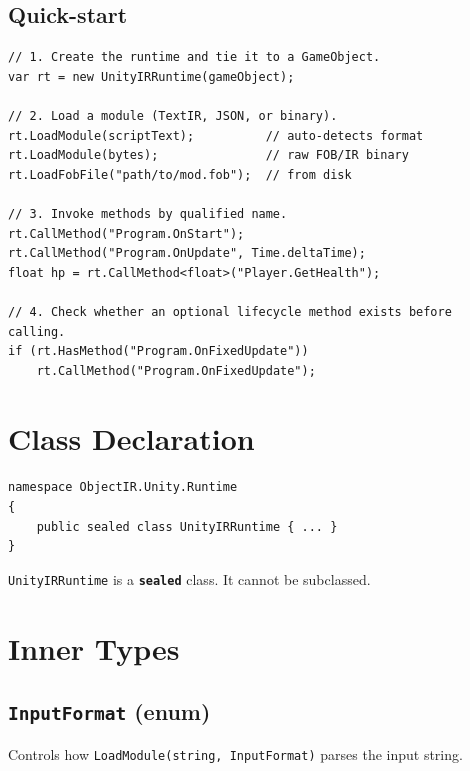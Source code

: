\documentclass[11pt,a4paper]{article}
\newcommand{\code}[1]{\texttt{\small #1}}
\newcommand{\kword}[1]{\textbf{\texttt{\small #1}}}
\begin{document}
\subsection{Quick-start}

\begin{lstlisting}[style=cs]
// 1. Create the runtime and tie it to a GameObject.
var rt = new UnityIRRuntime(gameObject);

// 2. Load a module (TextIR, JSON, or binary).
rt.LoadModule(scriptText);          // auto-detects format
rt.LoadModule(bytes);               // raw FOB/IR binary
rt.LoadFobFile("path/to/mod.fob");  // from disk

// 3. Invoke methods by qualified name.
rt.CallMethod("Program.OnStart");
rt.CallMethod("Program.OnUpdate", Time.deltaTime);
float hp = rt.CallMethod<float>("Player.GetHealth");

// 4. Check whether an optional lifecycle method exists before calling.
if (rt.HasMethod("Program.OnFixedUpdate"))
    rt.CallMethod("Program.OnFixedUpdate");
\end{lstlisting}

\section{Class Declaration}

\begin{lstlisting}[style=cs]
namespace ObjectIR.Unity.Runtime
{
    public sealed class UnityIRRuntime { ... }
}
\end{lstlisting}

\code{UnityIRRuntime} is a \kword{sealed} class. It cannot be subclassed.

\section{Inner Types}

\subsection{\texttt{InputFormat} (enum)}

Controls how \code{LoadModule(string, InputFormat)} parses the input string.
\end{document}
